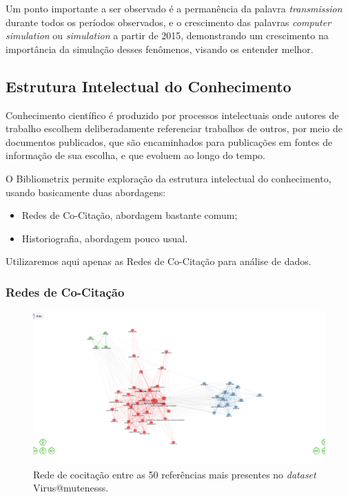 Um ponto importante a ser observado é a permanência da palavra \textit{transmission} durante todos os períodos observados, e o crescimento das palavras \textit{computer simulation} ou \textit{simulation} a partir de 2015, demonstrando um crescimento na importância da simulação desses fenômenos, visando os entender melhor.

\subsection{Estrutura Intelectual do Conhecimento}

Conhecimento científico é produzido por processos intelectuais onde autores de trabalho escolhem deliberadamente referenciar trabalhos de outros, por meio de documentos publicados, que são encaminhados para publicações em fontes de informação de sua escolha, e que evoluem ao longo do tempo.

 O Bibliometrix permite exploração da estrutura intelectual do conhecimento, usando basicamente duas abordagens:
 \begin{itemize}
     \item Redes de Co-Citação, abordagem bastante comum;
     \item Historiografia, abordagem pouco usual.
\end{itemize}
Utilizaremos aqui apenas as Redes de Co-Citação para análise de dados.

\subsubsection{Redes de Co-Citação}

\begin{figure}[H]
     \centering
     \includegraphics[width=1\textwidth]{exploratory-data-analysis/mutenesss/Virus/20221128/img/CocitationNetwork.png}
     \caption{Rede de cocitação entre as 50 referências mais presentes no  \textit{dataset} Virus@mutenesss.}
     \label{fig:Cocit:Virus@mutenesss}
\end{figure}

